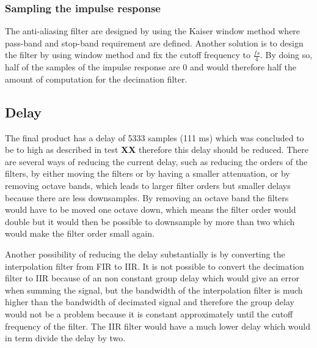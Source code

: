 \subsubsection*{Sampling the impulse response}
The anti-aliasing filter are designed by using the Kaiser window method where pass-band and stop-band requirement are defined. Another solution is to design the filter by using window method and fix the cutoff frequency to $\frac{fs}{4}$. By doing so, half of the samples of the impulse response are 0 and would therefore half the amount of computation for the decimation filter.






\subsection*{Delay}
The final product has a delay of 5333 samples (111 ms) which was concluded to be to high as described in test \textbf{XX} therefore this delay should be reduced. There are several ways of reducing the current delay, such as reducing the orders of the filters, by either moving the filters or by having a smaller attenuation, or by removing octave bands, which leads to larger filter orders but smaller delays because there are less downsamples. By removing an octave band the filters would have to be moved one octave down, which means the filter order would double but it would then be possible to downsample by more than two which would make the filter order small again.

Another possibility of reducing the delay substantially is by converting the interpolation filter from FIR to IIR. It is not possible to convert the decimation filter to IIR because of an non constant group delay which would give an error when summing the signal, but the bandwidth of the interpolation filter is much higher than the bandwidth of decimated signal and therefore the group delay would not be a problem because it is constant approximately until the cutoff frequency of the filter. The IIR filter would have a much lower delay which would in term divide the delay by two.   

